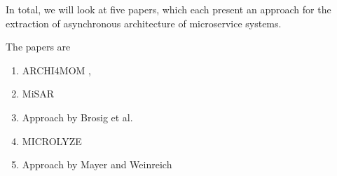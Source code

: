 
In total, we will look at five papers, which each present an approach for the extraction of asynchronous architecture of microservice systems.


The papers are
\begin{enumerate}
	\item ARCHI4MOM \cite{Singh2022ARCHI4MOM}, \cite{Singh2021}
	\item MiSAR \cite{Alshuqayran2018MiSAR}
	\item Approach by Brosig et al. \cite{Brosig2011}
	\item MICROLYZE \cite{Kleehaus2018} %
	\item Approach by Mayer and Weinreich \cite{Mayer2018} %
\end{enumerate}